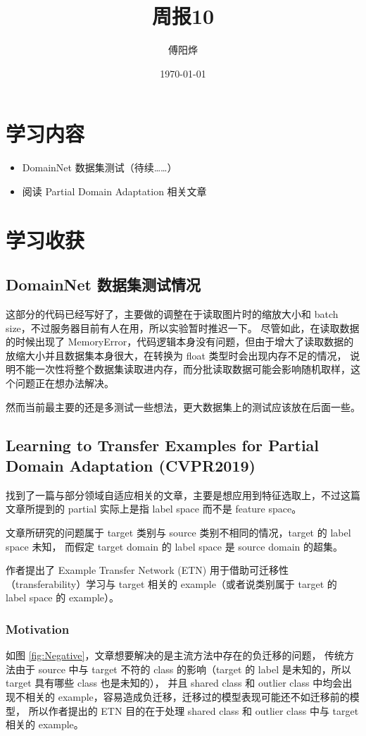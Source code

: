 \documentclass[UTF8]{ctexart}
\title{周报10}
\author{傅阳烨}
\date{\today}
\begin{document}
\maketitle
\section{学习内容}
\begin{itemize}
    \item DomainNet 数据集测试（待续……）
    \item 阅读 Partial Domain Adaptation 相关文章
\end{itemize}

\section{学习收获}
\subsection{DomainNet 数据集测试情况}
这部分的代码已经写好了，主要做的调整在于读取图片时的缩放大小和 batch size，不过服务器目前有人在用，所以实验暂时推迟一下。
尽管如此，在读取数据的时候出现了 MemoryError，代码逻辑本身没有问题，但由于增大了读取数据的放缩大小并且数据集本身很大，在转换为 float 类型时会出现内存不足的情况，
说明不能一次性将整个数据集读取进内存，而分批读取数据可能会影响随机取样，这个问题正在想办法解决。

然而当前最主要的还是多测试一些想法，更大数据集上的测试应该放在后面一些。

\subsection{Learning to Transfer Examples for Partial Domain Adaptation (CVPR2019)}

找到了一篇与部分领域自适应相关的文章，主要是想应用到特征选取上，不过这篇文章所提到的 partial 实际上是指 label space 而不是 feature space。

文章所研究的问题属于 target 类别与 source 类别不相同的情况，target 的 label space 未知，
而假定 target domain 的 label space 是 source domain 的超集。

作者提出了 Example Transfer Network (ETN) 用于借助可迁移性（transferability）学习与 target 相关的 example（或者说类别属于 target 的 label space 的 example）。

\subsubsection{Motivation}
如图 \ref{fig:Negative}，文章想要解决的是主流方法中存在的负迁移的问题，
传统方法由于 source 中与 target 不符的 class 的影响（target 的 label 是未知的，所以 target 具有哪些 class 也是未知的），
并且 shared class 和 outlier class 中均会出现不相关的 example，容易造成负迁移，迁移过的模型表现可能还不如迁移前的模型，
所以作者提出的 ETN 目的在于处理 shared class 和 outlier class 中与 target 相关的 example。
\end{document}
